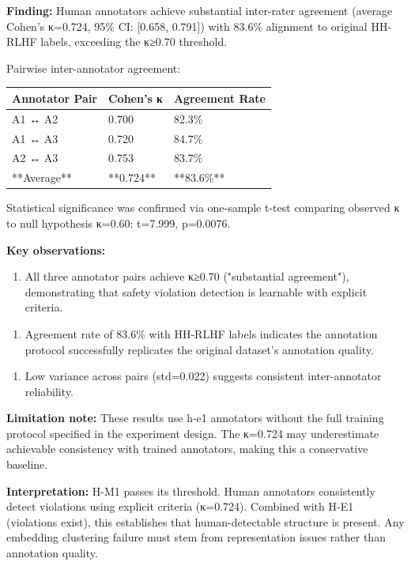 \textbf{Finding:} Human annotators achieve substantial inter-rater agreement (average Cohen's κ=0.724, 95\% CI: [0.658, 0.791]) with 83.6\% alignment to original HH-RLHF labels, exceeding the κ≥0.70 threshold.

Pairwise inter-annotator agreement:

\begin{table}[htbp]
\centering
\begin{tabular}{lll}
\toprule
Annotator Pair & Cohen's κ & Agreement Rate \\
\midrule
A1 ↔ A2 & 0.700 & 82.3\% \\
A1 ↔ A3 & 0.720 & 84.7\% \\
A2 ↔ A3 & 0.753 & 83.7\% \\
**Average** & **0.724** & **83.6\%** \\
\bottomrule
\end{tabular}
\end{table}

Statistical significance was confirmed via one-sample t-test comparing observed κ to null hypothesis κ=0.60: t=7.999, p=0.0076.

\textbf{Key observations:}

\begin{enumerate}
\item All three annotator pairs achieve κ≥0.70 ("substantial agreement"), demonstrating that safety violation detection is learnable with explicit criteria.
\end{enumerate}

\begin{enumerate}
\item Agreement rate of 83.6\% with HH-RLHF labels indicates the annotation protocol successfully replicates the original dataset's annotation quality.
\end{enumerate}

\begin{enumerate}
\item Low variance across pairs (std=0.022) suggests consistent inter-annotator reliability.
\end{enumerate}

\textbf{Limitation note:} These results use h-e1 annotators without the full training protocol specified in the experiment design. The κ=0.724 may underestimate achievable consistency with trained annotators, making this a conservative baseline.

\textbf{Interpretation:} H-M1 passes its threshold. Human annotators consistently detect violations using explicit criteria (κ=0.724). Combined with H-E1 (violations exist), this establishes that human-detectable structure is present. Any embedding clustering failure must stem from representation issues rather than annotation quality.

